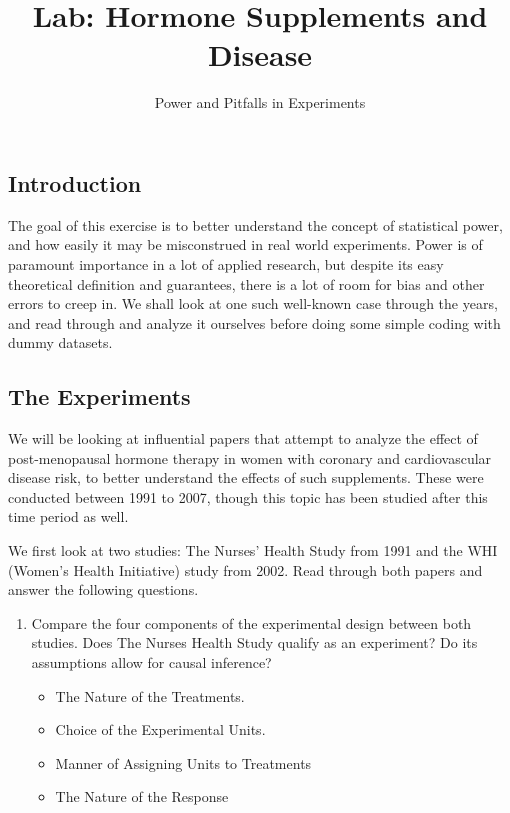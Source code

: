 \documentclass[
  letterpaper,
  DIV=11,
  numbers=noendperiod]{scrartcl}
\title{Lab: Hormone Supplements and Disease}
\subtitle{Power and Pitfalls in Experiments}
\author{}
\date{}
\begin{document}
\maketitle


\subsection{Introduction}\label{introduction}

The goal of this exercise is to better understand the concept of
statistical power, and how easily it may be misconstrued in real world
experiments. Power is of paramount importance in a lot of applied
research, but despite its easy theoretical definition and guarantees,
there is a lot of room for bias and other errors to creep in. We shall
look at one such well-known case through the years, and read through and
analyze it ourselves before doing some simple coding with dummy
datasets.

\subsection{The Experiments}\label{the-experiments}

We will be looking at influential papers that attempt to analyze the
effect of post-menopausal hormone therapy in women with coronary and
cardiovascular disease risk, to better understand the effects of such
supplements. These were conducted between 1991 to 2007, though this
topic has been studied after this time period as well.

We first look at two studies: The Nurses' Health Study from 1991 and the
WHI (Women's Health Initiative) study from 2002. Read through both
papers and answer the following questions.

\begin{enumerate}
\def\labelenumi{\arabic{enumi}.}
\item
  Compare the four components of the experimental design between both
  studies. Does The Nurses Health Study qualify as an experiment? Do its
  assumptions allow for causal inference?

  \begin{itemize}
  \item
    The Nature of the Treatments.
  \item
    Choice of the Experimental Units.
  \item
    Manner of Assigning Units to Treatments
  \item
    The Nature of the Response
  \end{itemize}
\end{enumerate}
\end{document}
